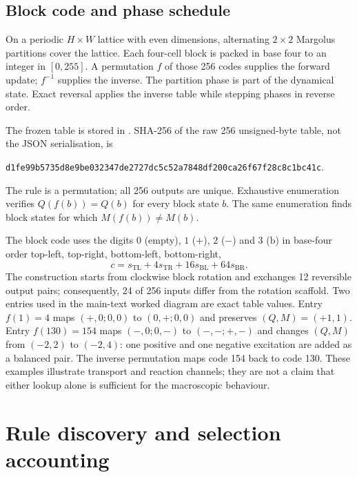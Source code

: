 \documentclass[11pt,a4paper]{article}
\newcommand{\code}[1]{\texttt{#1}}
\begin{document}
\subsection{Block code and phase schedule}
On a periodic $H\times W$ lattice with even dimensions, alternating $2\times2$ Margolus partitions cover the lattice. Each four-cell block is packed in base four to an integer in $[0,255]$. A permutation $f$ of those 256 codes supplies the forward update; $f^{-1}$ supplies the inverse. The partition phase is part of the dynamical state. Exact reversal applies the inverse table while stepping phases in reverse order.

\begingroup\sloppy The frozen table is stored in \allowbreak\mbox{}. SHA-256 of the raw 256 unsigned-byte table, not the JSON serialisation, is\par\endgroup
\begin{center}
\code{d1fe99b5735d8e9be032347de2727dc5c52a7848df200ca26f67f28c8c1bc41c}.
\end{center}
The rule is a permutation; all 256 outputs are unique. Exhaustive enumeration verifies $Q(f(b))=Q(b)$ for every block state $b$. The same enumeration finds block states for which $M(f(b))\ne M(b)$.

The block code uses the digits $0$ (empty), $1$ ($+$), $2$ ($-$) and $3$ ($\mathrm b$) in base-four order top-left, top-right, bottom-left, bottom-right,
\begin{equation}
c=s_{\mathrm{TL}}+4s_{\mathrm{TR}}+16s_{\mathrm{BL}}+64s_{\mathrm{BR}}.
\end{equation}
The construction starts from clockwise block rotation and exchanges 12 reversible output pairs; consequently, 24 of 256 inputs differ from the rotation scaffold. Two entries used in the main-text worked diagram are exact table values. Entry $f(1)=4$ maps $(+,0;0,0)$ to $(0,+;0,0)$ and preserves $(Q,M)=(+1,1)$. Entry $f(130)=154$ maps $(-,0;0,-)$ to $(-,-;+,-)$ and changes $(Q,M)$ from $(-2,2)$ to $(-2,4)$: one positive and one negative excitation are added as a balanced pair. The inverse permutation maps code 154 back to code 130. These examples illustrate transport and reaction channels; they are not a claim that either lookup alone is sufficient for the macroscopic behaviour.

\section{Rule discovery and selection accounting}
\end{document}
